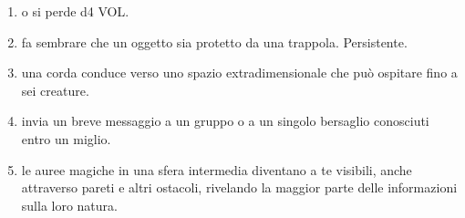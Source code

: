 \documentclass[itdr]{subfiles}
\begin{document}
\begin{enumerate}
	\item {}  o si perde d4 VOL.
	\item {} fa sembrare che un oggetto sia protetto da una trappola. Persistente.
	\item {} una corda conduce verso uno spazio extradimensionale che può ospitare fino a sei creature.
	\item {} invia un breve messaggio a un gruppo o a un singolo bersaglio conosciuti entro un miglio.
	\item {} le auree magiche in una sfera intermedia diventano a te visibili, anche attraverso pareti e altri ostacoli, rivelando la maggior parte delle informazioni sulla loro natura.
\end{enumerate}

\vfill
\break
\end{document}
